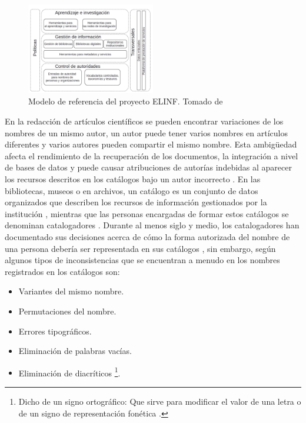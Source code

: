 \begin{figure}
\begin{center}
	\includegraphics[width=0.5\textwidth]{img/referenceModel.png}
\end{center}
\caption{Modelo de referencia del proyecto ELINF. Tomado de \citep{Ciudad-Ricardo2017}}
\label{fig: referenceModel}
\end{figure}

En la redacción de artículos científicos se pueden encontrar variaciones de los nombres de un mismo autor, un autor puede tener varios nombres en artículos diferentes y varios autores pueden compartir el mismo nombre. Esta ambigüedad afecta el rendimiento de la recuperación de los documentos, la integración a nivel de bases de datos y puede causar atribuciones de autorías indebidas al aparecer los recursos descritos en los catálogos bajo un autor incorrecto \citep{Han2005}. En las bibliotecas, museos o en archivos, un catálogo es un conjunto de datos organizados que describen los recursos de información gestionados por la institución \citep{InternationalFederationofLibraryAssociationsandInstitutions2009}, mientras que las personas encargadas de formar estos catálogos se denominan catalogadores \citep{RealAcademiaEspanola2014}. Durante al menos siglo y medio, los catalogadores han documentado sus decisiones acerca de cómo la forma autorizada del nombre de una persona debería ser representada en sus catálogos \citep{Tillett2009}, sin embargo, según \cite{Carrasco2016} algunos tipos de inconsistencias que se encuentran a menudo en los nombres registrados en los catálogos son:

\begin{itemize}
\item Variantes del mismo nombre.
\item Permutaciones del nombre.
\item Errores tipográficos.
\item Eliminación de palabras vacías.
\item Eliminación de diacríticos \footnote{Dicho de un signo ortográfico: Que sirve para modificar el valor de una letra o de un signo de representación fonética \citep{RealAcademiaEspanola2014}.}.
\end{itemize}

